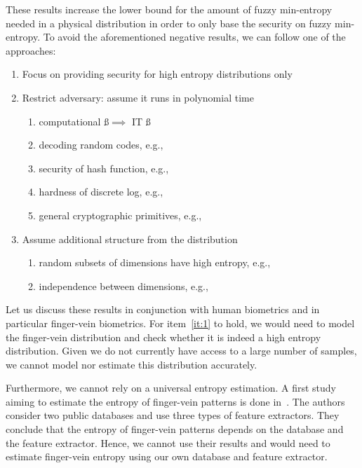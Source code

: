 These results increase the lower bound for the amount of fuzzy min-entropy needed in a physical distribution in order to only base the security on fuzzy min-entropy. 
To avoid the aforementioned negative results, we can follow one of the approaches:
\begin{enumerate}
\item Focus on providing security for high entropy distributions only\label{it:1}
\item Restrict adversary: assume it runs in polynomial time\label{it:2}
\begin{enumerate}
    \item computational \ss $\implies$ IT \ss~\cite{compfe}\label{it:2a}
    \item decoding random codes, e.g.,~\cite{compfe} %
    \item security of hash function, e.g.,~\cite{reusablefe,rpi}
    \item hardness of discrete log, e.g.,~\cite{wlh,wl}
    \item general cryptographic primitives, e.g.,~\cite{wlg}
\end{enumerate}
    \item Assume additional structure from the distribution\label{it:3}
\begin{enumerate}
    \item random subsets of dimensions have high entropy, e.g.,~\cite{reusablefe}\label{it:3a}
    \item independence between dimensions, e.g.,~\cite{tg}\label{it:3b}
\end{enumerate}
\end{enumerate}

Let us discuss these results in conjunction with human biometrics and in particular finger-vein biometrics.
For item~\ref{it:1} to hold, we would need to model the finger-vein distribution and check whether it is indeed a high entropy distribution. Given we do not currently have access to a large number of samples, we cannot model nor estimate this distribution accurately. 

Furthermore, we cannot rely on a universal entropy estimation.
A first study aiming to estimate the entropy of finger-vein patterns is done in~\cite{entropyfv}. The authors consider two public databases and use three types of feature extractors.
They conclude that the entropy of finger-vein patterns depends on the database and the feature extractor. Hence, we cannot use their results and would need to estimate finger-vein entropy using our own database and feature extractor.


